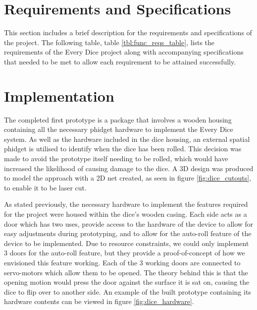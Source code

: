 \documentclass{sigchi}
\begin{document}
\section{Requirements and Specifications}

This section includes a brief description for the requirements and specifications of the project. The following table, table \ref{tbl:func_reqs_table}, lists the requirements of the Every Dice project along with accompanying specifications that needed to be met to allow each requirement to be attained successfully.

\onecolumn
\vspace{2em}




\twocolumn
\section{Implementation}

The completed first prototype is a package that involves a wooden housing containing all the necessary phidget hardware to implement the Every Dice system. As well as the hardware included in the dice housing, an external spatial phidget is utilised to identify when the dice has been rolled. This decision was made to avoid the prototype itself needing to be rolled, which would have increased the likelihood of causing damage to the dice. A 3D design was produced to model the approach with a 2D net created, as seen in figure \ref{fig:dice_cutouts}, to enable it to be laser cut.

 

As stated previously, the necessary hardware to implement the features required for the project were housed within the dice's wooden casing. Each side acts as a door which has two uses, provide access to the hardware of the device to allow for easy adjustments during prototyping, and to allow for the auto-roll feature of the device to be implemented. Due to resource constraints, we could only implement 3 doors for the auto-roll feature, but they provide a proof-of-concept of how we envisioned this feature working. Each of the 3 working doors are connected to servo-motors which allow them to be opened. The theory behind this is that the opening motion would press the door against the surface it is sat on, causing the dice to flip over to another side. An example of the built prototype containing its hardware contents can be viewed in figure \ref{fig:dice_hardware}.
\end{document}
